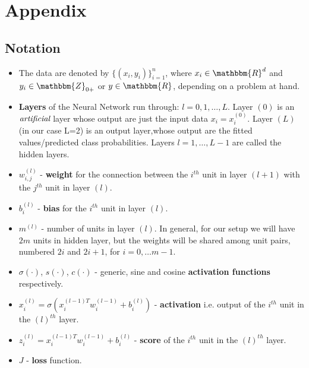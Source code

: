 \documentclass{article} %
\begin{document}
\section{Appendix}

\subsection{Notation}

\begin{itemize}
\item The data are denoted by $\{(x_i,y_i)\}_{i=1}^{n}$, where $x_i\in \mathbbm{R}^{d}$ and $y_i\in\mathbbm{Z}_{0+}$ or $y\in\mathbbm{R}$, depending on a problem at hand.
\item \textbf{Layers} of the Neural Network run through: $l = 0,1,\dots,L$. Layer $(0)$ is an $\emph{artificial}$ layer whose output are just the input data $x_i = x_i^{(0)}$. Layer $(L)$ (in our case L=2) is an output layer,whose output are the fitted values/predicted class probabilities. Layers $l=1,\dots,L-1$ are called the hidden layers.
\item $w_{i,j}^{(l)}$ - \textbf{weight} for the connection between the $i^{th}$ unit in layer $(l+1)$ with the $j^{th}$ unit in layer $(l)$.
\item $b_{i}^{(l)}$ - \textbf{bias} for the $i^{th}$ unit in layer $(l)$.
\item $m^{(l)}$ - number of units in layer $(l)$. In general, for our setup we will have $2m$ units in hidden layer, but the weights will be shared among unit pairs, numbered $2i$ and $2i+1$, for $i=0,\dots m-1$.
\item $\sigma(\cdot)$, $s(\cdot)$, $c(\cdot)$ - generic, sine and cosine \textbf{activation functions} respectively.
\item $x_i^{(l)} = \sigma(x_i^{(l-1)T}w_i^{(l-1)}+b_i^{(l)})$ - \textbf{activation} i.e. output of the $i^{th}$ unit in the $(l)^{th}$ layer.
\item $z_i^{(l)} = x_i^{(l-1)T}w_i^{(l-1)}+b_i^{(l)}$ - \textbf{score} of the $i^{th}$ unit in the $(l)^{th}$ layer.
\item $J$ - \textbf{loss} function.
\end{itemize}

\end{document}
